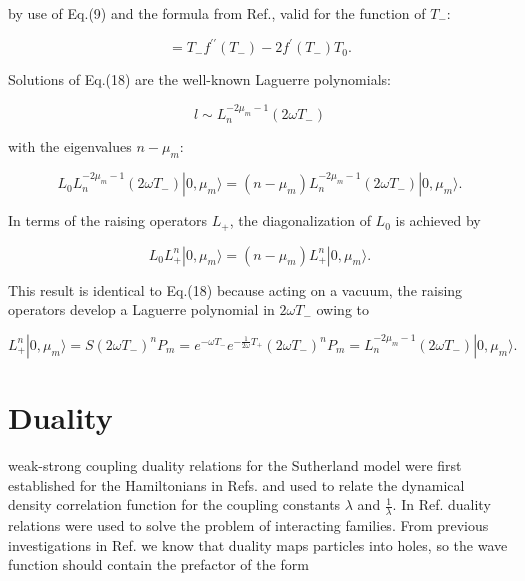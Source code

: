 \documentclass[a4paper,preprint,aps]{revtex4}
\begin{document}
by use of Eq.(9) and the formula from Ref.\cite{AJ}, valid for the function of
 $T_{-}$:


\begin{equation}
	[T_{+},f(T_{-})]=T_{-}f^{\prime \prime} (T_{-})-2f^{\prime}(T_{-})
	T_{0}.
\end{equation}


Solutions of Eq.(18) are the well-known Laguerre polynomials:


\begin{equation}
	l\sim L_{n}^{-2\mu_{m}-1}(2\omega T_{-})
\end{equation}

with the eigenvalues $n-\mu_{m}$:


\begin{equation}
	L_{0} L_{n}^{-2\mu_{m}-1}(2\omega T_{-})|0,\mu_{m}\rangle =
	(n-\mu_{m}) L_{n}^{-2\mu_{m}-1}(2\omega T_{-})|0,\mu_{m}\rangle .
\end{equation}

In terms of the raising operators $L_{+}$, the diagonalization of $L_{0}$ is
 achieved by

 
\begin{equation}
	L_{0}L_{+}^{n}|0,\mu_{m}\rangle =
	 (n-\mu_{m}) L_{+}^{n} |0,\mu_{m}\rangle .
\end{equation}

This result is identical to Eq.(18) because acting on a vacuum, the raising
 operators develop a Laguerre polynomial in $2 \omega T_{-}$ owing to 


\begin{equation}
	L_{+}^{n}|0,\mu_{m}\rangle=S(2\omega T_{-})^{n} P_{m}=
	e^{-\omega T_{-}} e^{-\frac{1}{2\omega} T_{+}} 
	(2\omega T_{-})^{n} P_{m}=
	L_{n}^{-2\mu_{m}-1} (2\omega T_{-}) |0,\mu_{m}\rangle .
\end{equation}    

\section{Duality}

weak-strong coupling duality relations for the Sutherland model were first
 established for the Hamiltonians in Refs. \cite{G,MP1} and used to relate the
 dynamical density correlation function for the coupling constants $\lambda$
 and $\frac{1}{\lambda}$. In Ref. \cite{AJ} duality relations were used to
 solve the problem of interacting families. From previous investigations
 in Ref.\cite{JPABJ} we
 know that duality maps particles into holes, so the wave function should
 contain the prefactor of the form
\end{document}
